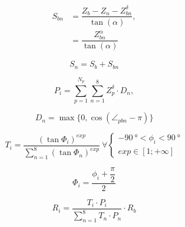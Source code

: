 \documentclass[10pt,a4paper]{article}
\begin{document}
	\begin{equation}
		\begin{split}
			S_{bn} & = \dfrac{Z_b - Z_n - Z_{bn}^{\delta}}{\tan(\alpha)}, \\
			& = \dfrac{Z_{bn}^{\alpha}}{\tan(\alpha)}
		\end{split}
	\end{equation}

	\begin{equation}
		S_n = S_b + S_{bn}
	\end{equation}


	\begin{equation}\label{equation:persistence}
		P_i = \sum_{p = 1}^{N_p} \sum_{n=1}^{8} Z^\delta_{p} \cdot D_{n},
	\end{equation}

	\begin{equation}\label{equation:direction}
		D_{n} = \max \{ 0,\cos{(\angle _{pbn} - \pi)} \}
	\end{equation}

	\begin{equation} \label{equation:terrain}
		T_{i} = \dfrac{\left(\tan \Phi_i \right)^{exp}}{\sum_{n=1}^{8}\left(\tan \Phi_n \right)^{exp}} \ \forall \begin{cases}
			\SI{-90}{\degree} < \phi_i < \SI{90}{\degree} \\
			exp \in \left[1; +\infty \right]
		\end{cases}
	\end{equation}

	\begin{equation}
		\Phi_i = \dfrac{\phi_i + \dfrac{\pi}{2}}{2}
	\end{equation}
	
	\begin{equation}\label{equation:routing}
		R_i = \dfrac{T_i \cdot P_i}{\sum_{n=1}^{8} T_n \cdot P_n} \cdot R_b 
	\end{equation}
	
\end{document}

